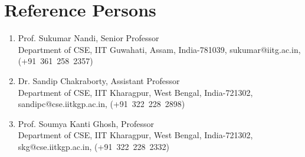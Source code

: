 \documentclass{article}
\begin{document}
\section{Reference Persons}
  \begin{enumerate}
  \item Prof. Sukumar Nandi, Senior Professor\\Department of CSE, IIT Guwahati, Assam, India-781039, sukumar@iitg.ac.in, (+91~361~258~2357)
  \item Dr. Sandip Chakraborty, Assistant Professor\\Department of CSE, IIT Kharagpur, West Bengal, India-721302, sandipc@cse.iitkgp.ac.in, (+91~322~228~2898)
  \item Prof. Soumya Kanti Ghosh, Professor\\Department of CSE, IIT Kharagpur, West Bengal, India-721302, skg@cse.iitkgp.ac.in, (+91~322~228~2332)
  \end{enumerate}
   \nocite{*}
  
  
\end{document}
